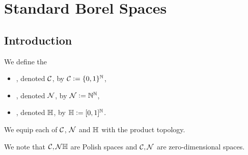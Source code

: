 \documentclass{book}
\begin{document}
	
	
	
	
	
	
	
	
	
	
	
	
	
	
	
	
	
	
	
	
	
	
	
	
	
	
	
	
	
	
	
	
	
	\newpage
	\chapter{Standard Borel Spaces}
	
	\section{Introduction}

	
	\begin{defn} 
		We define the 
		\begin{itemize}
			\item {}, denoted $\mathcal{C}$, by $\mathcal{C} \vcentcolon= \{0,1\}^{\mathbb{N}}$,
			\item {}, denoted $\mathcal{N}$, by $\mathcal{N} \vcentcolon= \mathbb{N}^{\mathbb{N}}$,
			\item {}, denoted $\mathbb{H}$, by $\mathbb{H} \vcentcolon= [0,1]^{\mathbb{N}}$.
		\end{itemize}
		We equip each of $\mathcal{C}$, $\mathcal{N}$ and $\mathbb{H}$ with the product topology.
	\end{defn}
	
	\begin{note}
		We note that  $\mathcal{C}, \mathcal{N} \mathbb{H}$ are Polish spaces and $\mathcal{C}, \mathcal{N}$ are zero-dimensional spaces.
	\end{note}
\end{document}
